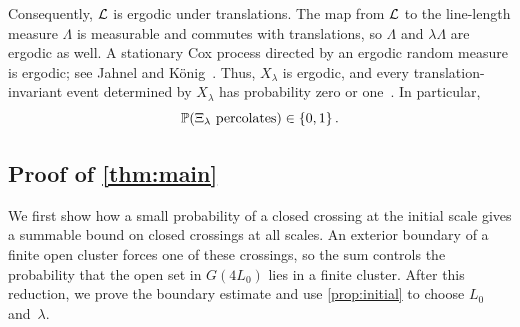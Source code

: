 \documentclass[11pt,letterpaper]{article}
\begin{document}
Consequently, $\cL$ is ergodic under translations. The map from $\cL$ to the line-length measure $\Lambda$ is measurable and commutes with translations, so $\Lambda$ and $\lambda\Lambda$ are ergodic as well. A stationary Cox process directed by an ergodic random measure is ergodic; see Jahnel and K\"onig~\cite[Exercise~6.4.14]{JK20}.
 Thus, $X_\lambda$ is ergodic, and every translation-invariant event determined by $X_\lambda$ has probability zero or one~\cite[Exercise~6.4.10]{JK20}. In particular,
\begin{equation}\label{eq:percolation-zero-one}
  \P(\Xi_\lambda\text{ percolates})\in\{0,1\}\,.
\end{equation}

\subsection{Proof of \texorpdfstring{\cref{thm:main}}{the first main theorem}}
\label{sec:proof-main}

We first show how a small probability of a closed crossing at the initial scale gives a summable bound on closed crossings at all scales. An exterior boundary of a finite open cluster forces one of these crossings, so the sum controls the probability that the open set in $G(4L_0)$ lies in a finite cluster. After this reduction, we prove the boundary estimate and use \cref{prop:initial} to choose $L_0$ and~$\lambda$.
\end{document}
